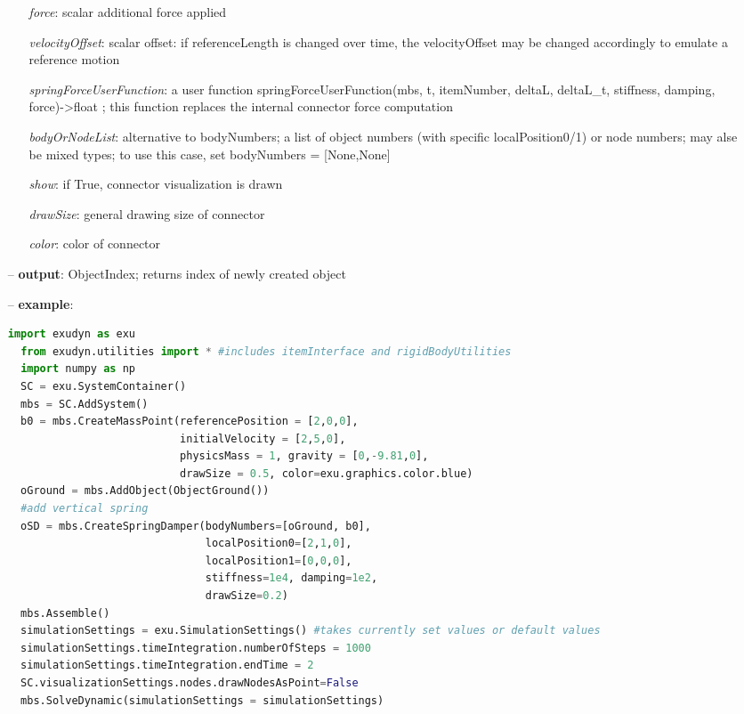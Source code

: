 \begin{itemize}[leftmargin=0.7cm]
\begin{itemize}[leftmargin=1.2cm]
\item[]{\it force}: scalar additional force applied
\item[]{\it velocityOffset}: scalar offset: if referenceLength is changed over time, the velocityOffset may be changed accordingly to emulate a reference motion
\item[]{\it springForceUserFunction}: a user function springForceUserFunction(mbs, t, itemNumber, deltaL, deltaL\_t, stiffness, damping, force)->float ; this function replaces the internal connector force computation
\item[]{\it bodyOrNodeList}: alternative to bodyNumbers; a list of object numbers (with specific localPosition0/1) or node numbers; may alse be mixed types; to use this case, set bodyNumbers = [None,None]
\item[]{\it show}: if True, connector visualization is drawn
\item[]{\it drawSize}: general drawing size of connector
\item[]{\it color}: color of connector
\end{itemize}
\item[--]
{\bf output}: ObjectIndex; returns index of newly created object
\item[--]
{\bf example}: \vspace{-12pt}\ei\begin{lstlisting}[language=Python, xleftmargin=36pt]
  import exudyn as exu
  from exudyn.utilities import * #includes itemInterface and rigidBodyUtilities
  import numpy as np
  SC = exu.SystemContainer()
  mbs = SC.AddSystem()
  b0 = mbs.CreateMassPoint(referencePosition = [2,0,0],
                           initialVelocity = [2,5,0],
                           physicsMass = 1, gravity = [0,-9.81,0],
                           drawSize = 0.5, color=exu.graphics.color.blue)
  oGround = mbs.AddObject(ObjectGround())
  #add vertical spring
  oSD = mbs.CreateSpringDamper(bodyNumbers=[oGround, b0],
                               localPosition0=[2,1,0],
                               localPosition1=[0,0,0],
                               stiffness=1e4, damping=1e2,
                               drawSize=0.2)
  mbs.Assemble()
  simulationSettings = exu.SimulationSettings() #takes currently set values or default values
  simulationSettings.timeIntegration.numberOfSteps = 1000
  simulationSettings.timeIntegration.endTime = 2
  SC.visualizationSettings.nodes.drawNodesAsPoint=False
  mbs.SolveDynamic(simulationSettings = simulationSettings)
\end{lstlisting}\vspace{-24pt}\bi\item[]\vspace{-24pt}\vspace{12pt}\end{itemize}
%

